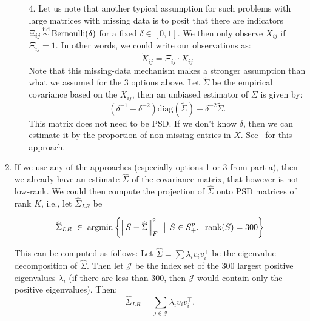 \begin{enumerate}[label=(\alph*)]
\begin{enumerate}
 \item[4.] Let us note that another typical assumption for such problems with large matrices with missing data is to posit that there are indicators $\Xi_{ij} \simiid \text{Bernoulli}(\delta)$ for a fixed $\delta \in [0,1]$. We then only observe $X_{ij}$ if $\Xi_{ij}=1$. In other words, we could write our observations as:
 $$ \tilde{X}_{ij} = \Xi_{ij} \cdot X_{ij}$$
Note that this missing-data mechanism makes a stronger assumption than what we assumed for the 3 options above. Let $\tilde{\Sigma}$ be the empirical covariance based on the $\tilde{X}_{ij}$, then an unbiased estimator of $\Sigma$ is given by:
$$(\delta^{-1} - \delta^{-2}) \text{diag}(\tilde{\Sigma} ) + \delta^{-2} \tilde{\Sigma}.$$
This matrix does not need to be PSD. If we don't know $\delta$, then we can estimate it by the proportion of non-missing entries in $X$. See~\citet{lounici2014high} for this approach.
\end{enumerate}


\item

If we use any of the approaches (especially options 1 or 3 from part a), then we already have an estimate $\widehat{\Sigma}$ of the covariance matrix, that however is not low-rank. We could then compute the projection of $\widehat{\Sigma}$ onto PSD matrices of rank $K$, i.e., let $\widehat{\Sigma}_{LR}$ be

$$\widehat{\Sigma}_{LR} \; \in \; \operatorname*{argmin} \left\{ \left\lVert S-\widehat{\Sigma}\right\rVert_F^2 \; \,\big|\, \; S \in S^p_+,\;\; \text{rank}(S) = 300\right\} $$

This can be computed as follows: Let $\widehat{\Sigma} = \sum \lambda_i v_i v_i^\top$ be the eigenvalue decomposition of $\widehat{\Sigma}$. Then let $\mathcal{J}$ be the index set of the 300 largest positive eigenvalues $\lambda_i$ (if there are less than 300, then $\mathcal{J}$ would contain only the positive eigenvalues).  Then:
$$\widehat{\Sigma}_{LR} = \sum_{j \in \mathcal{J}} \lambda_i v_i v_i^\top.$$




\end{enumerate}
